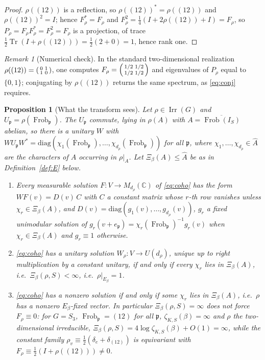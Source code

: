 \documentclass[11pt]{amsart}
\numberwithin{equation}{section}
\newtheorem{proposition}[theorem]{Proposition}
\theoremstyle{definition}
\theoremstyle{remark}
\newtheorem{remark}[theorem]{Remark}
\newcommand{\C}{\mathbb{C}}
\newcommand{\pp}{\mathfrak{p}}
\newcommand{\Frob}{\operatorname{Frob}}
\newcommand{\Irr}{\operatorname{Irr}}
\newcommand{\Tr}{\operatorname{Tr}}
\begin{document}
\begin{proof}
$\rho((12))$ is a reflection, so $\rho((12))^*=\rho((12))$ and $\rho((12))^2=I$; hence
$F_\rho^*=F_\rho$ and $F_\rho^2=\tfrac14(I+2\rho((12))+I)=F_\rho$, so $P_\rho=F_\rho F_\rho^*=F_\rho^2=F_\rho$
is a projection, of trace $\tfrac12\Tr(I+\rho((12)))=\tfrac12(2+0)=1$, hence rank one.
\end{proof}

\begin{remark}[Numerical check]\label{rem:numscalar}
In the standard two-dimensional realization $\rho((12))=\begin{psmallmatrix}0&1\\1&0\end{psmallmatrix}$,
one computes $F_\rho=\begin{psmallmatrix}1/2&1/2\\1/2&1/2\end{psmallmatrix}$ and eigenvalues
of $P_\rho$ equal to $\{0,1\}$; conjugating by $\rho((12))$ returns the same spectrum, as
\eqref{eq:conj} requires.
\end{remark}

\begin{proposition}[What the transform sees]\label{prop:gauge}
Let $\rho\in\Irr(G)$ and $U_\pp=\rho(\Frob_\pp)$. The $U_\pp$ commute, lying in $\rho(A)$
with $A=\overline{\Frob(I_S)}$ abelian, so there is a unitary $W$ with
$WU_\pp W^*=\mathrm{diag}(\chi_1(\Frob_\pp),\dots,\chi_{d_\rho}(\Frob_\pp))$ for all $\pp$,
where $\chi_1,\dots,\chi_{d_\rho}\in\widehat A$ are the characters of $A$ occurring in
$\rho|_A$. Let $\Xi_\beta(A)\le\widehat A$ be as in Definition~\ref{def:E} below.
\begin{enumerate}
\item Every measurable solution $F:V\to M_{d_\rho}(\C)$ of \eqref{eq:coho} has the form
$WF(v)=D(v)\,C$ with $C$ a constant matrix whose $r$-th row vanishes unless
$\chi_r\in\Xi_\beta(A)$, and $D(v)=\mathrm{diag}(g_1(v),\dots,g_{d_\rho}(v))$, $g_r$ a fixed
unimodular solution of $g_r(v+e_\pp)=\chi_r(\Frob_\pp)^{-1}g_r(v)$ when $\chi_r\in\Xi_\beta(A)$
and $g_r\equiv1$ otherwise.
\item \eqref{eq:coho} has a unitary solution $W_\rho:V\to U(d_\rho)$, unique up to right
multiplication by a constant unitary, if and only if every $\chi_r$ lies in $\Xi_\beta(A)$,
i.e.\ $\Xi_\beta(\rho,S)<\infty$, i.e.\ $\rho|_{E_\beta}=1$.
\item \eqref{eq:coho} has a nonzero solution if and only if some $\chi_r$ lies in
$\Xi_\beta(A)$, i.e.\ $\rho$ has a nonzero $E_\beta$-fixed vector. In particular
$\Xi_\beta(\rho,S)=\infty$ does \emph{not} force $F_\rho\equiv0$: for $G=S_3$,
$\Frob_\pp=(12)$ for all $\pp$, $\zeta_{K,S}(\beta)=\infty$ and $\rho$ the two-dimensional
irreducible, $\Xi_\beta(\rho,S)=4\log\zeta_{K,S}(\beta)+O(1)=\infty$, while the constant
family $\rho_v\equiv\frac12(\delta_e+\delta_{(12)})$ is equivariant with
$F_\rho\equiv\frac12(I+\rho((12)))\ne0$.
\end{enumerate}
\end{proposition}
\end{document}

